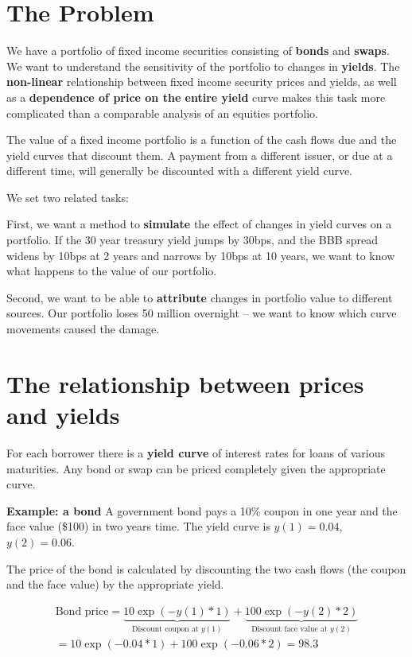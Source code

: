 \section{The Problem}
We have a portfolio of fixed income securities consisting of \textbf{bonds} and \textbf{swaps}. We want to understand the sensitivity of the portfolio to changes in \textbf{yields}. The \textbf{non-linear} relationship between fixed income security prices and yields, as well as a \textbf{dependence of price on the entire yield} curve makes this task more complicated than a comparable analysis of an equities portfolio. 

The value of a fixed income portfolio is a function of the cash flows due and the yield curves that discount them.  A payment from a different issuer, or due at a different time, will generally be discounted with a different yield curve.

We set two related tasks: 

First, we want a method to \textbf{simulate} the effect of changes in yield curves on a portfolio. If the 30 year treasury yield jumps by 30bps, and the BBB spread widens by 10bps at 2 years and narrows by 10bps at 10 years, we want to know what happens to the value of our portfolio.

Second, we want to be able to \textbf{attribute} changes in portfolio value to different sources. Our portfolio loses 50 million overnight -- we want to know which curve movements caused the damage. 

\section{The relationship between prices and yields }

For each borrower there is a \textbf{yield curve} of interest rates for loans of various maturities. Any bond or swap can be priced completely given the appropriate curve.

\textbf{Example: a bond} A government bond pays a 10\% coupon in one year and the face value (\$100) in two years time. The yield curve is $y(1)= 0.04$, $y(2) = 0.06$. 


The price of the bond is calculated by discounting the two cash flows (the coupon and the face value) by the appropriate yield. 

\begin{eqnarray*}
\textrm{Bond price} = \underbrace{10 \exp(-y(1)*1)}_{\textrm{Discount coupon at $y(1)$}} + \underbrace{100\exp(-y(2)*2)}_{\textrm{Discount face value at $y(2)$}}\\
=10 \exp(-0.04*1) + 100\exp(-0.06*2) = 98.3
\end{eqnarray*}

